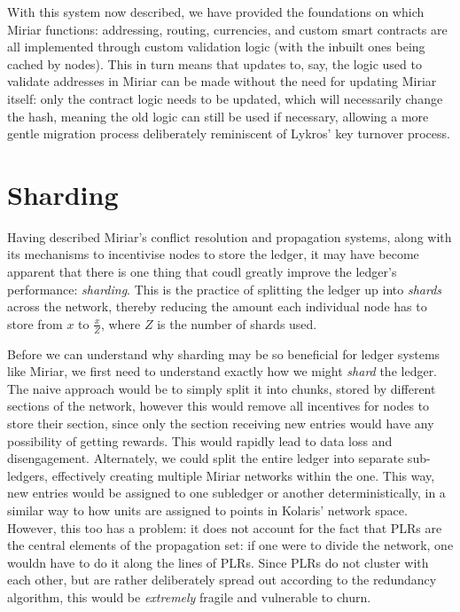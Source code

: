 \documentclass{extreport}
\begin{document}
With this system now described, we have provided the foundations on which Miriar functions: addressing, routing, currencies, and custom smart contracts are all implemented through custom validation logic (with the inbuilt ones being cached by nodes). This in turn means that updates to, say, the logic used to validate addresses in Miriar can be made without the need for updating Miriar itself: only the contract logic needs to be updated, which will necessarily change the hash, meaning the old logic can still be used if necessary, allowing a more gentle migration process deliberately reminiscent of Lykros' key turnover process.

\chapter{Sharding}
\label{sec:orga7ad456}

Having described Miriar's conflict resolution and propagation systems, along with its mechanisms to incentivise nodes to store the ledger, it may have become apparent that there is one thing that coudl greatly improve the ledger's performance: \emph{sharding}. This is the practice of splitting the ledger up into \emph{shards} across the network, thereby reducing the amount each individual node has to store from \(x\) to \(\frac{x}{Z}\), where \(Z\) is the number of shards used.

Before we can understand why sharding may be so beneficial for ledger systems like Miriar, we first need to understand exactly how we might \emph{shard} the ledger. The naive approach would be to simply split it into chunks, stored by different sections of the network, however this would remove all incentives for nodes to store their section, since only the section receiving new entries would have any possibility of getting rewards. This would rapidly lead to data loss and disengagement. Alternately, we could split the entire ledger into separate sub-ledgers, effectively creating multiple Miriar networks within the one. This way, new entries would be assigned to one subledger or another deterministically, in a similar way to how units are assigned to points in Kolaris' network space. However, this too has a problem: it does not account for the fact that PLRs are the central elements of the propagation set: if one were to divide the network, one wouldn have to do it along the lines of PLRs. Since PLRs do not cluster with each other, but are rather deliberately spread out according to the redundancy algorithm, this would be \emph{extremely} fragile and vulnerable to churn.
\end{document}
